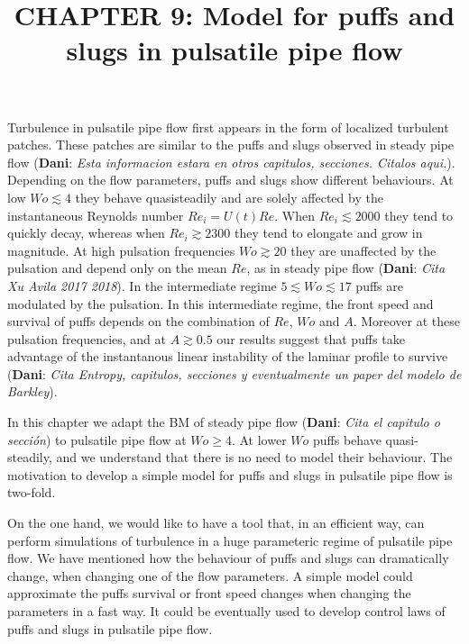 \documentclass{article}
\title{CHAPTER 9: Model for puffs and slugs in pulsatile pipe flow}
\date{}
\DeclareRobustCommand{\dm}[1]{{\color{blue}(\textbf{Dani}: \textit{#1}\xspace)}}
\begin{document}
\maketitle
Turbulence in pulsatile pipe flow first appears in the form of localized turbulent patches. These patches are similar to the puffs and slugs observed in steady pipe flow \dm{Esta informacion estara en otros capitulos, secciones. Citalos aqui.}. Depending on the flow parameters, puffs and slugs show different behaviours. At low $Wo \lesssim 4$ they behave quasisteadily and are solely affected by the instantaneous Reynolds number $Re_{i}= U\left( t \right) Re$. When $Re_{i} \lesssim 2000$ they tend to quickly decay, whereas when $Re_{i} \gtrsim 2300$ they tend to elongate and grow in magnitude. At high pulsation frequencies $Wo \gtrsim 20$ they are unaffected by the pulsation and depend only on the mean $Re$, as in steady pipe flow \dm{Cita Xu Avila 2017 2018}. In the intermediate regime $5 \lesssim Wo \lesssim 17$ puffs are modulated by the pulsation. In this intermediate regime, the front speed and survival of puffs depends on the combination of $Re$, $Wo$ and $A$. Moreover at these pulsation frequencies, and at $A\gtrsim 0.5$ our results suggest that puffs take advantage of the instantanous linear instability of the laminar profile to survive \dm{Cita Entropy, capitulos, secciones y eventualmente un paper del modelo de Barkley}.

In this chapter we adapt the BM of steady pipe flow \dm{Cita el capitulo o sección} to pulsatile pipe flow at $Wo \geq 4$. At lower $Wo$ puffs behave quasi-steadily, and we understand that there is no need to model their behaviour. The motivation to develop a simple model for puffs and slugs in pulsatile pipe flow is two-fold.

On the one hand, we would like to have a tool that, in an efficient way, can perform simulations of turbulence in a huge parameteric regime of pulsatile pipe flow. We have mentioned how the behaviour of puffs and slugs can dramatically change, when changing one of the flow parameters. A simple model could approximate the puffs survival or front speed changes when changing the parameters in a fast way. It could be eventually used to develop control laws of puffs and slugs in pulsatile pipe flow.
\end{document}
